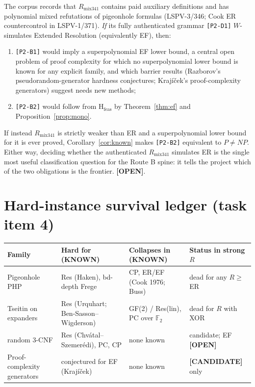 \documentclass[11pt]{article}
\theoremstyle{definition}
\theoremstyle{remark}
\newcommand{\status}[1]{\textbf{[#1]}}
\begin{document}
The corpus records that $R_{\mathrm{mix341}}$ contains paid auxiliary
definitions and has polynomial mixed refutations of pigeonhole formulas
(LSPV-3/346; Cook ER countercontrol in LSPV-1/371). \emph{If} its fully
authenticated grammar \texttt{[P2-D1]} $W$-simulates Extended Resolution
(equivalently EF), then:
\begin{enumerate}
\item \texttt{[P2-B1]} would imply a superpolynomial EF lower bound, a central
open problem of proof complexity for which no superpolynomial lower bound is
known for any explicit family, and which barrier results (Razborov's
pseudorandom-generator hardness conjectures; Kraj\'i\v{c}ek's proof-complexity
generators) suggest needs new methods;
\item \texttt{[P2-B2]} would follow from $\mathrm{H}_{\mathrm{feas}}$
by Theorem~\ref{thm:ef} and Proposition~\ref{prop:mono}.
\end{enumerate}
If instead $R_{\mathrm{mix341}}$ is strictly weaker than ER and a superpolynomial
lower bound for it is ever proved, Corollary~\ref{cor:known} makes
\texttt{[P2-B2]} equivalent to $P\ne NP$. Either way, deciding whether the
authenticated $R_{\mathrm{mix341}}$ simulates ER is the single most useful
classification question for the Route B spine: it tells the project which of
the two obligations is the frontier. \status{OPEN}.

\section{Hard-instance survival ledger (task item 4)}

\begin{center}
\small
\begin{tabular}{llll}
Family & Hard for (KNOWN) & Collapses in (KNOWN) & Status in strong $R$\\\hline
Pigeonhole PHP & Res (Haken), bd-depth Frege & CP, ER/EF (Cook 1976; Buss) & dead for any $R\ge$ER\\
Tseitin on expanders & Res (Urquhart; Ben-Sasson--Wigderson) & GF(2) / Res(lin), PC over $\mathbb F_2$ & dead for $R$ with XOR\\
random 3-CNF & Res (Chv\'atal--Szemer\'edi), PC, CP & none known & candidate; EF \status{OPEN}\\
Proof-complexity generators & conjectured for EF (Kraj\'i\v{c}ek) & none known & \status{CANDIDATE} only
\end{tabular}
\end{center}
\end{document}
